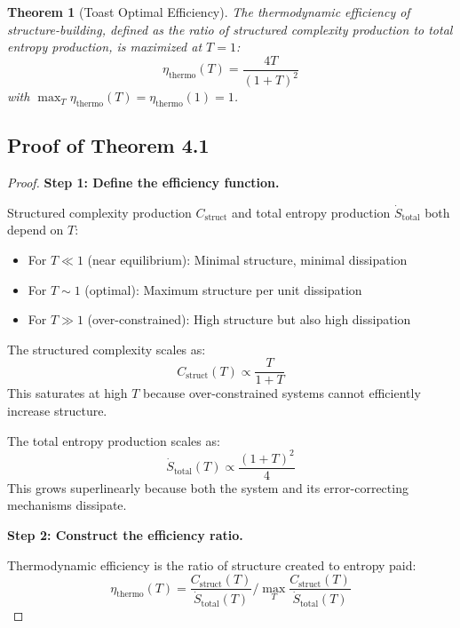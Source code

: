 \documentclass[11pt,a4paper]{article}
\newtheorem{theorem}{Theorem}[section]
\begin{document}
\begin{theorem}[Toast Optimal Efficiency]
The thermodynamic efficiency of structure-building, defined as the ratio of structured complexity production to total entropy production, is maximized at $T = 1$:
\begin{equation}
\eta_{\text{thermo}}(T) = \frac{4T}{(1+T)^2}
\end{equation}
with $\max_T \eta_{\text{thermo}}(T) = \eta_{\text{thermo}}(1) = 1$.
\end{theorem}

\subsection{Proof of Theorem 4.1}

\begin{proof}
\textbf{Step 1: Define the efficiency function.}

Structured complexity production $C_{\text{struct}}$ and total entropy production $\dot{S}_{\text{total}}$ both depend on $T$:
\begin{itemize}
\item For $T \ll 1$ (near equilibrium): Minimal structure, minimal dissipation
\item For $T \sim 1$ (optimal): Maximum structure per unit dissipation
\item For $T \gg 1$ (over-constrained): High structure but also high dissipation
\end{itemize}

The structured complexity scales as:
\begin{equation}
C_{\text{struct}}(T) \propto \frac{T}{1+T}
\end{equation}
This saturates at high $T$ because over-constrained systems cannot efficiently increase structure.

The total entropy production scales as:
\begin{equation}
\dot{S}_{\text{total}}(T) \propto \frac{(1+T)^2}{4}
\end{equation}
This grows superlinearly because both the system and its error-correcting mechanisms dissipate.

\textbf{Step 2: Construct the efficiency ratio.}

Thermodynamic efficiency is the ratio of structure created to entropy paid:
\begin{equation}
\eta_{\text{thermo}}(T) = \frac{C_{\text{struct}}(T)}{\dot{S}_{\text{total}}(T)} \Big/ \max_T \frac{C_{\text{struct}}(T)}{\dot{S}_{\text{total}}(T)}
\end{equation}


\end{proof}
\end{document}
